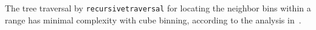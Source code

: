\documentclass[final]{juliacon}
\begin{document}
The tree traversal by \texttt{recursivetraversal} for locating the neighbor bins
within a range has minimal complexity with cube binning, according to the
analysis in~\cite{iliopoulos2020}.


%
%
%
 
%
%
%

 

%
%
%

%

%

%
%



 
\end{document}
